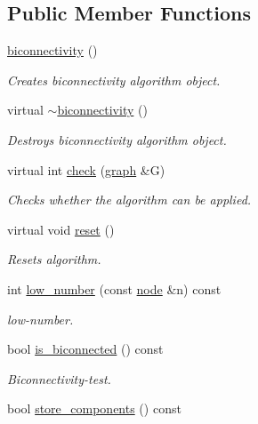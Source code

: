 \subsection*{Public Member Functions}
\begin{DoxyCompactItemize}
\item 
\mbox{\hyperlink{classbiconnectivity_a2ac204c72d74090e4e24e83a98351f6a}{biconnectivity}} ()
\begin{DoxyCompactList}\small\item\em Creates biconnectivity algorithm object. \end{DoxyCompactList}\item 
virtual \mbox{\hyperlink{classbiconnectivity_af8e2bb061de4a08f95a2a3a94fdbd797}{$\sim$biconnectivity}} ()
\begin{DoxyCompactList}\small\item\em Destroys biconnectivity algorithm object. \end{DoxyCompactList}\item 
virtual int \mbox{\hyperlink{classbiconnectivity_a65e0e821f5e9ce8d210648d462fd2cfa}{check}} (\mbox{\hyperlink{classgraph}{graph}} \&G)
\begin{DoxyCompactList}\small\item\em Checks whether the algorithm can be applied. \end{DoxyCompactList}\item 
virtual void \mbox{\hyperlink{classbiconnectivity_a4393dd1e626887472f6967722349abc6}{reset}} ()
\begin{DoxyCompactList}\small\item\em Resets algorithm. \end{DoxyCompactList}\item 
int \mbox{\hyperlink{classbiconnectivity_ab61a092bfc7cf9e9b27210d339186327}{low\+\_\+number}} (const \mbox{\hyperlink{classnode}{node}} \&n) const
\begin{DoxyCompactList}\small\item\em low-\/number. \end{DoxyCompactList}\item 
bool \mbox{\hyperlink{classbiconnectivity_a50e7cee997b6d56ccbb9ae3fd039d9cd}{is\+\_\+biconnected}} () const
\begin{DoxyCompactList}\small\item\em Biconnectivity-\/test. \end{DoxyCompactList}\item 
bool \mbox{\hyperlink{classbiconnectivity_a1234e7a70f50fd60c855529fe6fa4acb}{store\+\_\+components}} () const

\end{DoxyCompactItemize}

